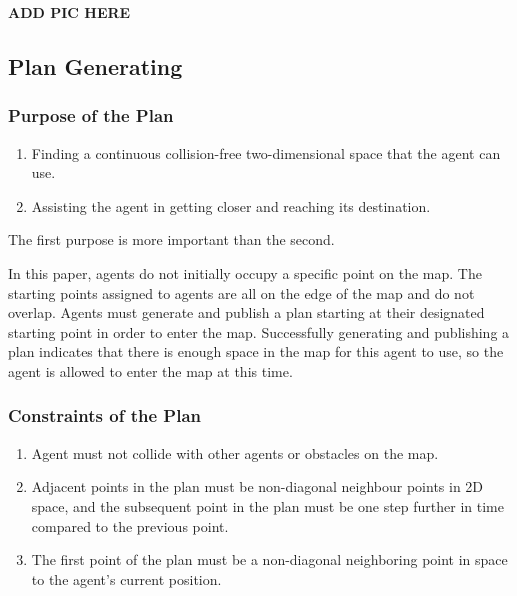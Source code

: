 \textbf{ADD PIC HERE}%

\subsection{Plan Generating}
\subsubsection{Purpose of the Plan}
\begin{enumerate}
    \item Finding a continuous collision-free two-dimensional space that the agent can use.
    \item Assisting the agent in getting closer and reaching its destination.
\end{enumerate}

The first purpose is more important than the second.

In this paper, agents do not initially occupy a specific point on the map. The starting points assigned to agents are all on the edge of the map and do not overlap. Agents must generate and publish a plan starting at their designated starting point in order to enter the map.
Successfully generating and publishing a plan indicates that there is enough space in the map for this agent to use, so the agent is allowed to enter the map at this time.

\subsubsection{Constraints of the Plan}

\begin{enumerate}
    \item Agent must not collide with other agents or obstacles on the map.
    \item Adjacent points in the plan must be non-diagonal neighbour points in 2D space, and the subsequent point in the plan must be one step further in time compared to the previous point.
    \item The first point of the plan must be a non-diagonal neighboring point in space to the agent's current position.
\end{enumerate}

